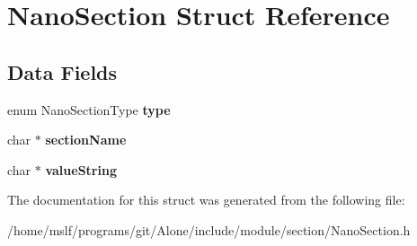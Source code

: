 \hypertarget{struct_nano_section}{}\section{Nano\+Section Struct Reference}
\label{struct_nano_section}
\subsection*{Data Fields}
\begin{DoxyCompactItemize}
\item 
\hypertarget{struct_nano_section_aeae10b894b52ddb05dceb1b2076bef58}{}\label{struct_nano_section_aeae10b894b52ddb05dceb1b2076bef58} 
enum Nano\+Section\+Type {\bfseries type}
\item 
\hypertarget{struct_nano_section_a7dadb8f2b7c0ffb34931b35b5af02e99}{}\label{struct_nano_section_a7dadb8f2b7c0ffb34931b35b5af02e99} 
char $\ast$ {\bfseries section\+Name}
\item 
\hypertarget{struct_nano_section_a8037948a06654abd0c88a662e924f832}{}\label{struct_nano_section_a8037948a06654abd0c88a662e924f832} 
char $\ast$ {\bfseries value\+String}
\end{DoxyCompactItemize}


The documentation for this struct was generated from the following file\+:\begin{DoxyCompactItemize}
\item 
/home/mslf/programs/git/\+Alone/include/module/section/Nano\+Section.\+h\end{DoxyCompactItemize}
